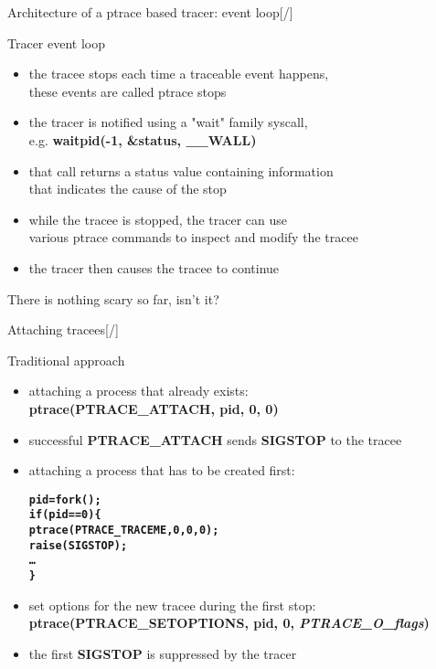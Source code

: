 \documentclass[unicode,aspectratio=169,xcolor={table,dvipsnames,usernames}]{beamer}
\begin{document}
\begin{frame}{\Large Architecture of a ptrace based tracer: event loop\hfill [\insertframenumber/\inserttotalframenumber]}
\Large
\begin{block}{Tracer event loop}
\begin{itemize}
	\item the tracee stops each time a traceable event happens, \\
		these events are called ptrace stops
	\item the tracer is notified using a "wait" family syscall, \\
		e.g. \textbf{waitpid(-1, \&status, \_\_WALL)}
	\item that call returns a status value containing information \\
		that indicates the cause of the stop
	\item while the tracee is stopped, the tracer can use \\
		various ptrace commands to inspect and modify the tracee
	\item the tracer then causes the tracee to continue
\end{itemize}
\end{block}

There is nothing scary so far, isn't it?
\end{frame}

\begin{frame}[fragile]{\Large Attaching tracees\hfill [\insertframenumber/\inserttotalframenumber]}
\large
\begin{block}{Traditional approach}
\begin{itemize}
	\item attaching a process that already exists: \\
		\textbf{ptrace(PTRACE\_ATTACH, pid, 0, 0)}
	\item successful \textbf{PTRACE\_ATTACH} sends \textbf{SIGSTOP} to the tracee
	\item attaching a process that has to be created first:
	\begin{alltt}\bf
		pid = fork();
		if (pid == 0) \{
		    ptrace(PTRACE_TRACEME, 0, 0, 0);
		    raise(SIGSTOP);
		    \ldots
		\}
	\end{alltt}
	\item set options for the new tracee during the first stop: \\
		\textbf{ptrace(PTRACE\_SETOPTIONS, pid, 0, \textit{PTRACE\_O\_flags})}
	\item the first \textbf{SIGSTOP} is suppressed by the tracer
\end{itemize}
\end{block}
\end{frame}
\end{document}
